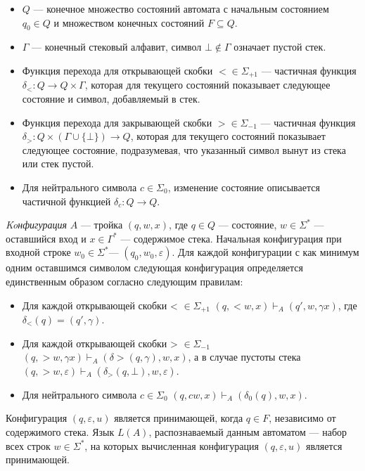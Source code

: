 \documentclass{spbau-diploma}
\begin{document}
\begin{itemize}
	\item $Q$ --- конечное множество состояний автомата с начальным состоянием $q_0 \in Q$ и множеством конечных состояний $F  \subseteq Q$.
	\item $\Gamma$ --- конечный стековый алфавит, символ $\bot \not\in \Gamma$ означает пустой стек. 
         \item Функция перехода  для открывающей скобки $< \in \Sigma_{+1}$  --- частичная функция $\delta_<: Q \rightarrow Q \times \Gamma$, которая для текущего состояний показывает следующее состояние и символ, добавляемый в стек.
         \item Функция перехода  для закрывающей скобки $> \in \Sigma_{-1}$  --- частичная функция $\delta_>: Q \times (\Gamma \cup \{ \bot \}) \rightarrow Q$, которая для текущего состояний показывает следующее состояние,  подразумевая, что указанный символ вынут из стека или стек пустой.
	\item Для нейтрального символа $c \in \Sigma_0$, изменение состояние описывается частичной функцией $\delta_c: Q \rightarrow Q$.
\end{itemize}
\textit{Koнфигурация} $A$ --- тройка $(q, w, x)$, где $q \in Q$ --- состояние, $w \in \Sigma^*$ --- оставшийся вход и $x \in \Gamma^*$ --- содержимое стека. Начальная конфигурация при входной строке $w_0 \in \Sigma^*$--- $(q_0, w_0, \varepsilon)$. Для каждой конфигурации с как минимум одним оставшимся символом следующая конфигурация определяется единственным образом согласно следующим правилам:
\begin{itemize}
         \item Для каждой открывающей скобки < $\in \Sigma_{+1}$  $(q, <w, x) \vdash_A (q', w,  \gamma x)$, где $\delta_<(q) = (q', \gamma)$.
         \item Для каждой открывающей скобки > $\in \Sigma_{-1}$  $(q, >w,\gamma x) \vdash_A (\delta >(q, \gamma),  w, x)$, а в случае пустоты стека $(q, >w, \varepsilon) \vdash_A (\delta_>(q, \bot),  w, \varepsilon)$.
	\item Для нейтрального символа $c \in \Sigma_0$ $(q, cw, x) \vdash_A (\delta_0(q),  w, x)$.
\end{itemize}
Конфигурация $(q, \varepsilon, u)$ является принимающей, когда $q \in F$, независимо от содержимого стека. Язык $L(A)$, распознаваемый данным автоматом --- набор всех строк $w \in \Sigma^*$, на которых вычисленная конфигурация  $(q, \varepsilon, u)$ является принимающей. \par
\end{document}
